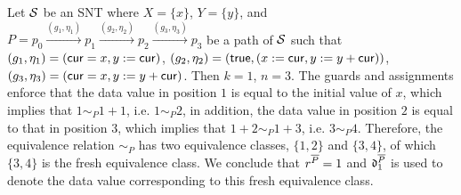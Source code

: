
\begin{example}
Let ${\mathcal{S} }$ be an SNT where $X=\{x\}$, $Y=\{y\}$, and $P = p_0 \xrightarrow{(g_1,\eta_1)} p_1 \xrightarrow{(g_2,\eta_2)} p_2  \xrightarrow{(g_3,\eta_3)} p_3$ be a path of ${\mathcal{S} }$ such that $(g_1,\eta_1) = (\mathsf{cur} = x, y:= \mathsf{cur})$, $(g_2,\eta_2)= (\mathsf{true}, (x:=\mathsf{cur}, y:=y+\mathsf{cur}))$, $(g_3,\eta_3)= (\mathsf{cur}=x, y:=y+\mathsf{cur})$. Then $k=1$, $n=3$. The guards and assignments enforce that the data value in position $1$ is equal to the initial value of $x$, which implies that $1 \sim_P 1+1$, i.e. $1 \sim_P 2$, in addition, the data value in position $2$ is equal to that in position $3$, which implies that $1+2 \sim_P 1+3$, i.e. $3 \sim_P 4$. Therefore, the equivalence relation $\sim_P$ has two equivalence classes, $\{1,2\}$ and $\{3,4\}$, of which $\{3,4\}$ is the fresh equivalence class. We conclude that $r^{\overline{P}}=1$ and $\mathfrak{d}^{\overline{P}}_1$ is used to denote the data value corresponding to this fresh equivalence class.
\end{example}





